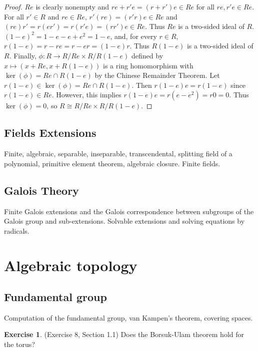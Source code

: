 \documentclass[12pt, psamsfonts]{amsart}
\theoremstyle{definition}
\newtheorem*{exer}{Exercise}
\theoremstyle{remark}
\numberwithin{equation}{section}
\begin{document}
\begin{proof}
  $Re$ is clearly nonempty and $re + r'e = (r + r')e \in Re$ for all $re, r'e \in Re$.
  For all $r' \in R$ and $re \in Re$, $r'(re) = (r'r)e \in Re$ and $(re)r' = r(er') = r(r'e) = (rr')e \in Re$.
  Thus $Re$ is a two-sided ideal of $R$.
  $(1 - e)^2 = 1 - e - e + e^2 = 1 - e$, and, for every $r \in R$, $r(1 - e) = r - re = r - er = (1 - e)r$.
  Thus $R(1 - e)$ is a two-sided ideal of $R$.
  Finally, $\phi: R \rightarrow R / Re \times R / R(1 - e)$ defined by $x \mapsto (x + Re, x + R(1 - e))$ is a ring homomorphism with $\ker(\phi) = Re \cap R(1 - e)$ by the Chinese Remainder Theorem.
  Let $r(1 - e) \in \ker(\phi) = Re \cap R(1 - e)$.
  Then $r(1 - e)e = r(1 - e)$ since $r(1 - e) \in Re$.
  However, this implies $r(1 - e)e = r(e - e^2) = r0 = 0$.
  Thus $\ker(\phi) = 0$, so $R \cong R / Re \times R / R(1 - e)$.
\end{proof}


\subsection{Fields Extensions}
Finite, algebraic, separable, inseparable, transcendental, splitting field of a polynomial, primitive element theorem, algebraic closure.
Finite fields.

\subsection{Galois Theory}
Finite Galois extensions and the Galois correspondence between subgroups of the Galois group and sub-extensions.
Solvable extensions and solving equations by radicals.

\section{Algebraic topology}

\subsection{Fundamental group}
Computation of the fundamental group, van Kampen's theorem, covering spaces.

\begin{exer}{(Exercise 8, Section 1.1)}
  Does the Borsuk-Ulam theorem hold for the torus?
\end{exer}
\end{document}
